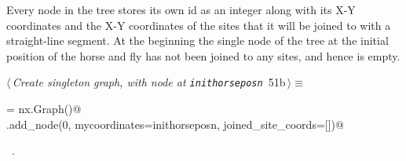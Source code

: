 \documentclass[11.5pt]{report}
\begin{document}
\vspace{-0.8cm} \newchunk Every node in the tree stores its own id as an integer along with 
its X-Y coordinates and the X-Y coordinates of the sites that it will be joined to with a 
straight-line segment. At the beginning the single node of the tree at the initial position
of the horse and fly has not been joined to any sites, and hence is empty. 

\begin{flushleft} \small
\begin{minipage}{\linewidth}\label{scrap75}\raggedright\small
{} $\langle\,${\itshape Create singleton graph, with node at \verb|inithorseposn|}\nobreak\ {\footnotesize {51b}}$\,\rangle\equiv$
\vspace{-1ex}
\begin{list}{}{} \item
\mbox{}\verb@G = nx.Graph()@\\
\mbox{}\verb@G.add_node(0, mycoordinates=inithorseposn, joined_site_coords=[])@\\
\mbox{}\verb@@{\NWsep}
\end{list}
\vspace{-1.5ex}
\footnotesize
\begin{list}{}{\setlength{\itemsep}{-\parsep}\setlength{\itemindent}{-\leftmargin}}
\item \NWtxtMacroRefIn\ .

\item{}
\end{list}
\end{minipage}\vspace{4ex}
\end{flushleft}
\end{document}
